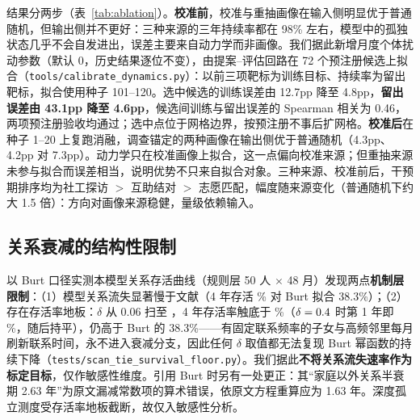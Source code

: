 \documentclass[10.5pt,twocolumn]{ctexart}
\begin{document}
结果分两步（表~\ref{tab:ablation}）。\textbf{校准前}，校准与重抽画像在输入侧明显优于普通随机，但输出侧并不更好：三种来源的三年持续率都在 98\% 左右，模型中的孤独状态几乎不会自发进出，误差主要来自动力学而非画像。我们据此新增月度个体扰动参数（默认 0，历史结果逐位不变），由提案--评估回路在 72 个预注册候选上拟合（\texttt{tools/calibrate\_dynamics.py}）：以前三项靶标为训练目标、持续率为留出靶标，拟合使用种子 101--120。选中候选的训练误差由 12.7pp 降至 4.8pp，\textbf{留出误差由 43.1pp 降至 4.6pp}，候选间训练与留出误差的 Spearman 相关为 0.46，两项预注册验收均通过；选中点位于网格边界，按预注册不事后扩网格。\textbf{校准后}在种子 1--20 上复跑消融，调查锚定的两种画像在输出侧优于普通随机（4.3pp、4.2pp 对 7.3pp）。动力学只在校准画像上拟合，这一点偏向校准来源；但重抽来源未参与拟合而误差相当，说明优势不只来自拟合对象。三种来源、校准前后，干预期排序均为社工探访 $>$ 互助结对 $>$ 志愿匹配，幅度随来源变化（普通随机下约大 1.5 倍）：方向对画像来源稳健，量级依赖输入。

\begin{table}[t]
\centering\small
\caption{画像消融（规则层，20 种子 $\times$ 20 人）。TVD 越小越贴近调查边际分布；输出误差为四项靶标平均绝对误差（pp）。}
\label{tab:ablation}
\end{table}

\subsection{关系衰减的结构性限制}\label{sec:decay}
以 Burt 口径实测本模型关系存活曲线（规则层 50 人 $\times$ 48 月）发现两点\textbf{机制层限制}：（1）模型关系流失显著慢于文献（4 年存活 \TieSurvFourYr\% 对 Burt 拟合 38.3\%）；（2）存在存活率地板：$\delta$ 从 0.06 扫至 \TieFloorDecay，4 年存活率触底于 \TieFloor\%（$\delta=0.4$ 时第 1 年即 \TieFloorYrOne\%，随后持平），仍高于 Burt 的 38.3\%——有固定联系频率的子女与高频邻里每月刷新联系时间，永不进入衰减分支，因此任何 $\delta$ 取值都无法复现 Burt 幂函数的持续下降（\texttt{tests/scan\_tie\_survival\_floor.py}）。我们据此\textbf{不将关系流失速率作为标定目标}，仅作敏感性维度。引用 Burt 时另有一处更正：其``家庭以外关系半衰期 2.63 年''为原文漏减常数项的算术错误，依原文方程重算应为 1.63 年\citep{burt2000decay}。深度孤立测度受存活率地板截断，故仅入敏感性分析。
\end{document}
